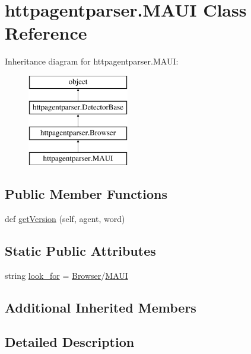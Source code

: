 \hypertarget{classhttpagentparser_1_1_m_a_u_i}{}\section{httpagentparser.\+M\+A\+UI Class Reference}
\label{classhttpagentparser_1_1_m_a_u_i}
Inheritance diagram for httpagentparser.\+M\+A\+UI\+:\begin{figure}[H]
\begin{center}
\leavevmode
\includegraphics[height=4.000000cm]{classhttpagentparser_1_1_m_a_u_i}
\end{center}
\end{figure}
\subsection*{Public Member Functions}
\begin{DoxyCompactItemize}
\item 
def \hyperlink{classhttpagentparser_1_1_m_a_u_i_a1d3dc94b98aabc4a4f9f15c52e6f4404}{get\+Version} (self, agent, word)
\end{DoxyCompactItemize}
\subsection*{Static Public Attributes}
\begin{DoxyCompactItemize}
\item 
string \hyperlink{classhttpagentparser_1_1_m_a_u_i_afda465f6a86bd6de141bf079f36e662b}{look\+\_\+for} = \textquotesingle{}\hyperlink{classhttpagentparser_1_1_browser}{Browser}/\hyperlink{classhttpagentparser_1_1_m_a_u_i}{M\+A\+UI}\textquotesingle{}
\end{DoxyCompactItemize}
\subsection*{Additional Inherited Members}


\subsection{Detailed Description}


